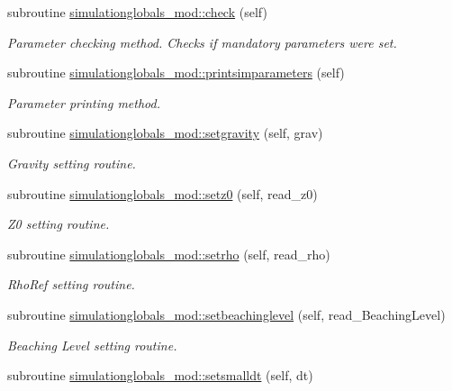 \begin{DoxyCompactItemize}
subroutine \mbox{\hyperlink{namespacesimulationglobals__mod_a3d337e9c28136dd9c67fa576f05cd44b}{simulationglobals\+\_\+mod\+::check}} (self)
\begin{DoxyCompactList}\small\item\em Parameter checking method. Checks if mandatory parameters were set. \end{DoxyCompactList}\item 
subroutine \mbox{\hyperlink{namespacesimulationglobals__mod_ab67964fe7c3fb20a4ce0b4193520aa1d}{simulationglobals\+\_\+mod\+::printsimparameters}} (self)
\begin{DoxyCompactList}\small\item\em Parameter printing method. \end{DoxyCompactList}\item 
subroutine \mbox{\hyperlink{namespacesimulationglobals__mod_ae6b88d15ddc389aedd73d600de0337df}{simulationglobals\+\_\+mod\+::setgravity}} (self, grav)
\begin{DoxyCompactList}\small\item\em Gravity setting routine. \end{DoxyCompactList}\item 
subroutine \mbox{\hyperlink{namespacesimulationglobals__mod_a36c2833caae3767434115cc966fe2c5d}{simulationglobals\+\_\+mod\+::setz0}} (self, read\+\_\+z0)
\begin{DoxyCompactList}\small\item\em Z0 setting routine. \end{DoxyCompactList}\item 
subroutine \mbox{\hyperlink{namespacesimulationglobals__mod_a7d41fc05216d326ae8c0b090362430d3}{simulationglobals\+\_\+mod\+::setrho}} (self, read\+\_\+rho)
\begin{DoxyCompactList}\small\item\em Rho\+Ref setting routine. \end{DoxyCompactList}\item 
subroutine \mbox{\hyperlink{namespacesimulationglobals__mod_a3b24d0338ee34782c8e2ab57bba7b5f6}{simulationglobals\+\_\+mod\+::setbeachinglevel}} (self, read\+\_\+\+Beaching\+Level)
\begin{DoxyCompactList}\small\item\em Beaching Level setting routine. \end{DoxyCompactList}\item 
subroutine \mbox{\hyperlink{namespacesimulationglobals__mod_ad36c21a592a3230ce848804075abc97e}{simulationglobals\+\_\+mod\+::setsmalldt}} (self, dt)

\end{DoxyCompactItemize}
